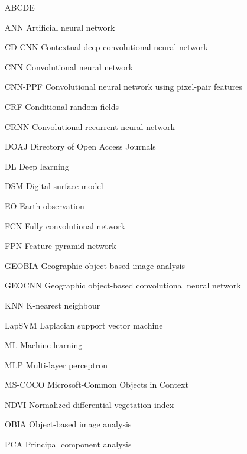 
\begin{seznamzkratek}{ABCDE}

	      {ANN}
	      {Artificial neural network}

	      {CD-CNN}
	      {Contextual deep convolutional neural network}

	      {CNN}
	      {Convolutional neural network}

	      {CNN-PPF}
	      {Convolutional neural network using pixel-pair features}

	      {CRF}
	      {Conditional random fields}

	      {CRNN}
	      {Convolutional recurrent neural network}

	      {DOAJ}
	      {Directory of Open Access Journals}

	      {DL}
	      {Deep learning}

	      {DSM}
	      {Digital surface model}

	      {EO}
	      {Earth observation}

	      {FCN}
	      {Fully convolutional network}

	      {FPN}
	      {Feature pyramid network}

	      {GEOBIA}
	      {Geographic object-based image analysis}

	      {GEOCNN}
	      {Geographic object-based convolutional neural network}

	      {KNN}
	      {K-nearest neighbour}

	      {LapSVM}
	      {Laplacian support vector machine}

	      {ML}
	      {Machine learning}

	      {MLP}
	      {Multi-layer perceptron}

	      {MS-COCO}
	      {Microsoft-Common Objects in Context}

	      {NDVI}
	      {Normalized differential vegetation index}

	      {OBIA}
	      {Object-based image analysis}

	      {PCA}
	      {Principal component analysis}


\end{seznamzkratek}
